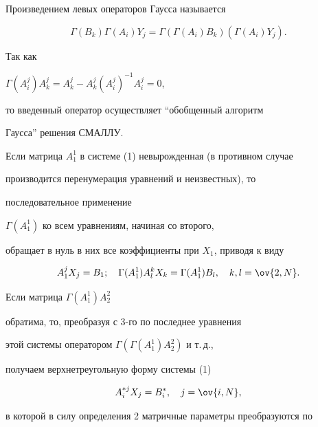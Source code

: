  


\begin{defn} 


Произведением левых операторов Гаусса называется 


$$ 


\Gamma(B_k)\Gamma(A_i)Y_j=\Gamma(\Gamma(A_i)B_k) 


(\Gamma(A_i)Y_j). 


$$ 


\end{defn} 


 


Так как 


$\Gamma(A^j_i)A^j_k=A^j_k-A^j_k(A^j_i)^{-1}A^j_i=0$, 


то введенный оператор осуществляет ``обобщенный алгоритм 


Гаусса'' решения СМАЛЛУ. 


 


Если матрица $A^1_1$ в системе (1) невырожденная (в противном случае 


производится перенумерация уравнений и неизвестных), то 


последовательное применение 


$\Gamma(A^1_1)$ ко всем уравнениям, начиная со второго, 


обращает в нуль в них все коэффициенты при $X_1$, приводя к виду 


$$ 


A^j_1X_j=B_1;\quad 


\Gamma(A^1_1)A^k_l X_k=\Gamma(A^1_1)B_l,\quad 


k,l=\ov{2,N}. 


$$ 


Если матрица $\Gamma(A^1_1)A^2_2$ 


обратима, то, преобразуя с 3-го по последнее уравнения


этой системы оператором $\Gamma(\Gamma(A^1_1)A^2_2)$ и т.\,д., 


получаем верхнетреугольную форму системы (1) 


\begin{equation} 


A^{*j}_i X_j=B^*_i,\quad j=\ov{i,N}, 


\end{equation} 


в которой в силу определения 2 матричные параметры преобразуются по 


